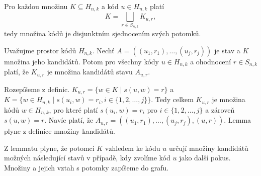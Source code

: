 \begin{lemma}\label{lemmadisjunktnipotomci}
    Pro každou množinu $K \subseteq H_{n,k}$ a kód $u \in H_{n,k}$ platí
    \[K = \bigsqcup_{r\in S_{n,k}} K_{u,r},\]
    tedy množina kódů je disjunktním sjednocením svých potomků.
\end{lemma}



\begin{lemma}\label{lemmavztahnaslednikuapotomku}
    Uvažujme prostor kódů $H_{n,k}$. Nechť $A = \left((u_1, r_1), \dots, (u_j,r_j)\right)$ je stav a $K$ množina jeho kandidátů. Potom pro všechny kódy $u\in H_{n,k}$ a ohodnocení $r \in S_{n,k}$ platí, že $K_{u,r}$ je množina kandidátů stavu $A_{u,r}$.
\end{lemma}
\begin{dukaz}
    Rozepíšeme z definic. 
    $K_{u,r} = \{w \in K \mid s(u,w) = r\}$ a $K = \{w \in H_{n,k} \mid s(u_i,w) = r_i,  i \in \{1,2,\dots ,j\} \}$. Tedy celkem 
    $K_{u,r}$ je množina kódů $w \in H_{n,k}$, pro které platí $s(u_i,w) = r_i$ pro $i \in \{1,2,\dots ,j\}$ a zároveň $s(u,w) = r$.
    Navíc platí, že $A_{u,r} = \left((u_1, r_1), \dots, (u_j,r_j), (u,r)\right)$. Lemma plyne z definice množiny kandidátů.
\end{dukaz}
Z lemmatu plyne, že potomci $K$ vzhledem ke kódu $u$ určují množiny kandidátů možných následující stavů v případě, kdy zvolíme kód $u$ jako další pokus. Množiny a jejich vztah s potomky zapíšeme do grafu. 

